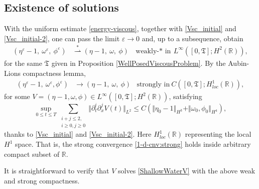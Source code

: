 \documentclass[reqno,11pt]{amsart}
\newcommand{\norm}[2]{\Vert #1 \Vert_{#2}}
\theoremstyle{plain}
\theoremstyle{definition}
\numberwithin{equation}{section}
\begin{document}
\subsection{Existence of solutions}
\label{Ex-U}
With the uniform estimate \eqref{energy-viscous}, together with \eqref{Vsc_initial} and \eqref{Vsc_initial-2}, one can pass the limit $ \varepsilon \rightarrow 0 $ and, up to a subsequence, obtain
\begin{align}
    (\eta^\varepsilon - 1, ~ \omega^\varepsilon,~ \phi^\varepsilon) & \overset{*}{\rightharpoonup}  (\eta -1, ~ \omega, ~ \phi) & \text{weakly-$*$ in} ~ L^\infty([0,\mathfrak{T}];H^2(\mathbb R)),
\end{align}
for the same $\mathfrak{T}$ given in Proposition \ref{WellPosedViscousProblem}. By the Aubin-Lions compactness lemma, 
\begin{align}
\label{1-d-cnv:strong}
    (\eta^\varepsilon - 1, ~ \omega^\varepsilon, \phi^\varepsilon) & \rightarrow  (\eta -1, ~ \omega, ~ \phi) & \text{strongly in} ~ C([0,\mathfrak{T}];H^1_{loc}(\mathbb R)),
\end{align}
for some $ V = (\eta-1,\omega,\phi) \in L^\infty([0,\mathfrak{T}];H^2(\mathbb R)) $, satisfying 
\begin{equation}
        \label{energy-viscous-2}
        \sup_{0\leq t \leq T} \sum_{\substack{i + j \leq 2, \\
        i \geq 0, j \geq 0}} \norm{\partial_t^i\partial_x^j V(t)}{L^2} \leq C (\norm{\eta_0-1}{H^3} + \norm{\omega_0,\phi_0}{H^{4}} ),
    \end{equation}
thanks to \eqref{Vsc_initial} and \eqref{Vsc_initial-2}. Here $ H_{loc}^1(\mathbb R) $ representing the local $ H^1 $ space. That is, the strong convergence \eqref{1-d-cnv:strong} holds inside arbitrary compact subset of $ \mathbb R $. 

It is straightforward to verify that $ V $ solves \eqref{ShallowWaterV} with the above weak and strong compactness. 

\iffalse
\end{document}
